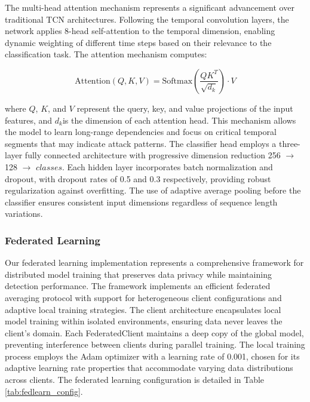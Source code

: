 The multi-head attention mechanism represents a significant advancement over traditional TCN architectures. Following the temporal convolution layers, the network applies 8-head self-attention to the temporal dimension, enabling dynamic weighting of different time steps based on their relevance to the classification task. The attention mechanism computes:

\begin{equation}
	\text{Attention}(Q, K, V) = \text{Softmax}\left(\frac{QK^T}{\sqrt{d_k}}\right) \cdot V
	\label{eq:attention}
\end{equation}

where $Q$, $K$, and $V$ represent the query, key, and value projections of the input features, and \( d_k \)​ is the dimension of each attention head. This mechanism allows the model to learn long-range dependencies and focus on critical temporal segments that may indicate attack patterns. The classifier head employs a three-layer fully connected architecture with progressive dimension reduction {256 $\rightarrow$ 128 $\rightarrow$ $classes$}. Each hidden layer incorporates batch normalization and dropout, with dropout rates of 0.5 and 0.3 respectively, providing robust regularization against overfitting. The use of adaptive average pooling before the classifier ensures consistent input dimensions regardless of sequence length variations. \\


\subsubsection{Federated Learning}
Our federated learning implementation represents a comprehensive framework for distributed model training that preserves data privacy while maintaining detection performance. The framework implements an efficient federated averaging protocol with support for heterogeneous client configurations and adaptive local training strategies. The client architecture encapsulates local model training within isolated environments, ensuring data never leaves the client's domain. Each FederatedClient maintains a deep copy of the global model, preventing interference between clients during parallel training. The local training process employs the Adam optimizer with a learning rate of 0.001, chosen for its adaptive learning rate properties that accommodate varying data distributions across clients. The federated learning configuration is detailed in Table \ref{tab:fedlearn_config}.

